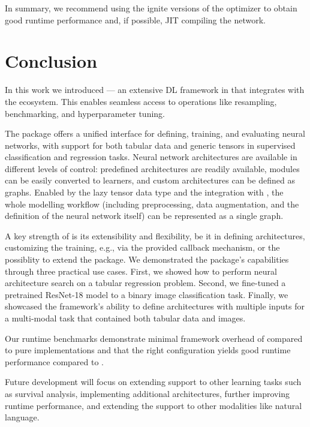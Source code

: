 \documentclass[article]{jss}
\theoremstyle{definition}
\begin{document}
In summary, we recommend using the ignite versions of the optimizer to obtain good runtime performance and, if possible, JIT compiling the network.

\section{Conclusion}\label{sec:conclusion}

In this work we introduced  --- an extensive DL framework in \rlang{} that integrates with the \mlrt{} ecosystem.
This enables seamless access to operations like resampling, benchmarking, and hyperparameter tuning.

The package offers a unified interface for defining, training, and evaluating neural networks, with support for both tabular data and generic tensors in supervised classification and regression tasks.
Neural network architectures are available in different levels of control: predefined architectures are readily available, \torch{} modules can be easily converted to \mlrttorch{} learners, and custom architectures can be defined as graphs.
Enabled by the lazy tensor data type and the integration with \mlrtpipelines{}, the whole modelling workflow (including preprocessing, data augmentation, and the definition of the neural network itself) can be represented as a single graph.

A key strength of  is its extensibility and flexibility, be it in defining architectures, customizing the training, e.g., via the provided callback mechanism, or the possiblity to extend the package.
We demonstrated the package's capabilities through three practical use cases. First, we showed how to perform neural architecture search on a tabular regression problem.
Second, we fine-tuned a pretrained ResNet-18 model to a binary image classification task.
Finally, we showcased the framework's ability to define architectures with multiple inputs for a multi-modal task that contained both tabular data and images.

Our runtime benchmarks demonstrate minimal framework overhead of \mlrttorch{} compared to pure \torch{} implementations and that the right configuration yields good runtime performance compared to \pytorch{}.

Future development will focus on extending support to other learning tasks such as survival analysis, implementing additional architectures, further improving runtime performance, and extending the support to other modalities like natural language.
\end{document}
